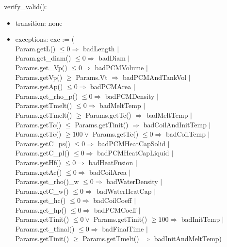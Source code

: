 \documentclass[12pt]{article}
\begin{document}
verify\_valid(): 
\begin{itemize}
\item transition: none
\item exceptions: exc := (\\
Param.getL() $\leq 0 \Rightarrow$ badLength $|$\\
Param.get\_diam() $\leq 0 \Rightarrow$ badDiam $|$\\
Params.get\_Vp() $\leq 0 \Rightarrow$ badPCMVolume $|$\\
Params.getVp() $\geq$ Params.Vt $\Rightarrow$ badPCMAndTankVol $|$\\
Params.getAp() $\leq 0 \Rightarrow$ badPCMArea $|$\\
Params.get\_rho\_p() $\leq 0 \Rightarrow$ badPCMDensity $|$\\
Params.getTmelt() $\leq 0 \Rightarrow$ badMeltTemp $|$\\
Params.getTmelt() $\geq$ Params.getTc() $\Rightarrow$ badMeltTemp $|$\\
Params.getTc() $\leq$ Params.getTinit() $\Rightarrow$ badCoilAndInitTemp $|$\\
Params.getTc() $\geq 100 \lor$ Params.getTc() $\leq 0 \Rightarrow$ badCoilTemp $|$\\
Params.getC\_ps() $\leq 0 \Rightarrow$ badPCMHeatCapSolid $|$\\
Params.getC\_pl() $\leq 0 \Rightarrow$ badPCMHeatCapLiquid $|$\\
Params.getHf() $\leq 0 \Rightarrow$ badHeatFusion $|$\\
Params.getAc() $\leq 0 \Rightarrow$ badCoilArea $|$\\
Params.get\_rho()\_w $\leq 0 \Rightarrow$ badWaterDensity $|$\\
Params.getC\_w() $\leq 0 \Rightarrow$ badWaterHeatCap $|$\\
Params.get\_hc() $\leq 0 \Rightarrow$ badCoilCoeff $|$\\
Params.get\_hp() $\leq 0 \Rightarrow$ badPCMCoeff $|$\\
Params.getTinit() $\leq 0 \lor$ Params.getTinit() $\geq 100 \Rightarrow$
badInitTemp $|$\\
Params.get\_tfinal() $\leq 0 \Rightarrow$ badFinalTime $|$\\
Params.getTinit() $\geq$ Params.getTmelt() $\Rightarrow$ badInitAndMeltTemp)  
\end{itemize}
\end{document}
